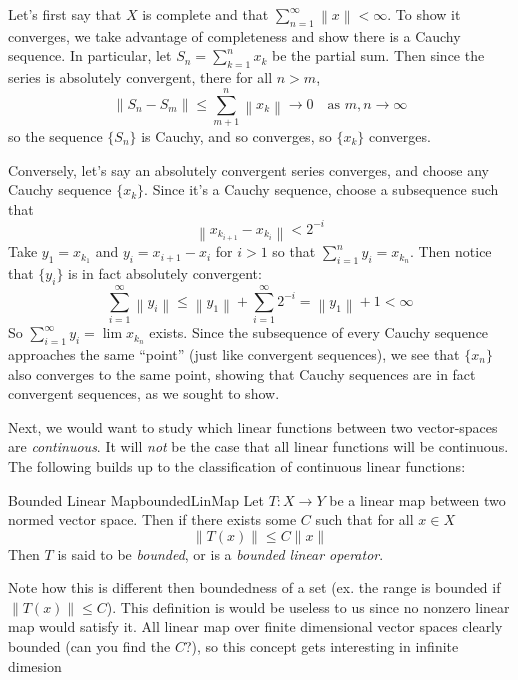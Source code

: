 \documentclass[oneside]{book}
\newcommand{\rw}{\rightarrow}
\begin{document}
\begin{Proof}
	Let's first say that $X$ is complete and that $\sum_{n=1}^\infty \left\| x\right\| < \infty$. To show it converges,
	we take advantage of completeness and show there is a Cauchy sequence. In particular, let $S_n = \sum_{k=1}^n x_k$
	be the partial sum. Then
	since the series is absolutely convergent, there for all $n > m$,
	\[
		\left\| S_n - S_m\right\| \le \sum_{m+1}^n \left\| x_k\right\| \rw 0 \quad\text{as $m,n \rw \infty$}
	\]
	so the sequence $\{S_n\}$ is Cauchy, and so converges, so $\{x_k\}$ converges.

	Conversely, let's say an absolutely convergent series converges, and choose any Cauchy sequence $\{x_k\}$. Since
	it's a Cauchy sequence, choose a subsequence such that
	\[
		\left\| x_{k_{i+1}} - x_{k_i}\right\| < 2^{-i}
	\]
	Take $y_1 = x_{k_1}$ and $y_i = x_{i+1} - x_i$ for $i>1$ so that $\sum_{i=1}^n y_i = x_{k_n}$. Then notice that
	$\{y_i\}$ is in fact absolutely convergent:
	\[
		\sum_{i=1}^\infty \left\| y_i\right\| \le \left\| y_1\right\| + \sum_{i=1}^\infty 2^{-i} = \left\| y_1\right\|
		+ 1 < \infty
	\]
	So $\sum_{i=1}^\infty y_i = \lim x_{k_n}$ exists. Since the subsequence of every Cauchy sequence approaches the same
	``point'' (just like convergent sequences), we see that $\{x_n\}$ also converges to the same point, showing that
	Cauchy sequences are in fact convergent sequences, as we sought to show.
\end{Proof}


Next, we would want to study which linear functions between two vector-spaces are \emph{continuous}. It will \emph{not}
be the case that all linear functions will be continuous. The following builds up to the classification of continuous
linear functions:

\begin{defn}{Bounded Linear Map}{boundedLinMap}
	Let $T: X \rw Y$ be a linear map between two normed vector space. Then if there exists some $C$ such that for all $x
	\in X$
	\[
		\|T(x)\| \le C\|x\|
	\]
	Then $T$ is said to be \emph{bounded}, or is a \emph{bounded linear operator}.
\end{defn}

Note how this is different then boundedness of a set (ex. the range is bounded if $\|T(x)\| \le C$). This definition is
would be useless to us since no nonzero linear map would satisfy it. All linear map over finite dimensional vector
spaces clearly bounded (can you find the $C$?), so this concept gets interesting in infinite dimesion
\end{document}
